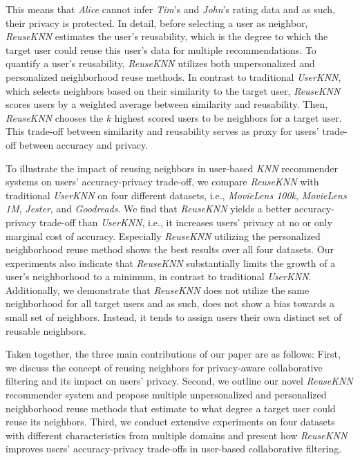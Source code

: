 \documentclass[manuscript,review,anonymous]{acmart}
\begin{document}
This means that \emph{Alice} cannot infer \emph{Tim}'s and \emph{John}'s rating data and as such, their privacy is protected.
In detail, before selecting a user as neighbor, \emph{ReuseKNN} estimates the user's reusability, which is the degree to which the target user could reuse this user's data for multiple recommendations. 
To quantify a user's reusability, \emph{ReuseKNN} utilizes both unpersonalized and personalized neighborhood reuse methods.
In contrast to traditional \emph{UserKNN}, which selects neighbors based on their similarity to the target user, \emph{ReuseKNN} scores users by a weighted average between similarity and reusability.
Then, \emph{ReuseKNN} chooses the $k$ highest scored users to be neighbors for a target user. 
This trade-off between similarity and reusability serves as proxy for users' trade-off between accuracy and privacy.

To illustrate the impact of reusing neighbors in user-based \emph{KNN} recommender systems on users' accuracy-privacy trade-off, we compare \emph{ReuseKNN} with traditional \emph{UserKNN} on four different datasets, i.e., \emph{MovieLens 100k}, \emph{MovieLens 1M}, \emph{Jester}, and \emph{Goodreads}. 
We find that \emph{ReuseKNN} yields a better accuracy-privacy trade-off than \emph{UserKNN}, i.e., it increases users' privacy at no or only marginal cost of accuracy.
Especially \emph{ReuseKNN} utilizing the personalized neighborhood reuse method shows the best results over all four datasets.
Our experiments also indicate that \emph{ReuseKNN} substantially limits the growth of a user's neighborhood to a minimum, in contrast to traditional \emph{UserKNN}.
Additionally, we demonstrate that \emph{ReuseKNN} does not utilize the same neighborhood for all target users and as such, does not show a bias towards a small set of neighbors.
Instead, it tends to assign users their own distinct set of reusable neighbors.

Taken together, the three main contributions of our paper are as follows: 
First, we discuss the concept of reusing neighbors for privacy-aware collaborative filtering and its impact on users' privacy.
Second, we outline our novel \emph{ReuseKNN} recommender system and propose multiple unpersonalized and personalized neighborhood reuse methods that estimate to what degree a target user could reuse its neighbors.
Third, we conduct extensive experiments on four datasets with different characteristics from multiple domains and present how \emph{ReuseKNN} improves users' accuracy-privacy trade-offs in user-based collaborative filtering. 
\end{document}
